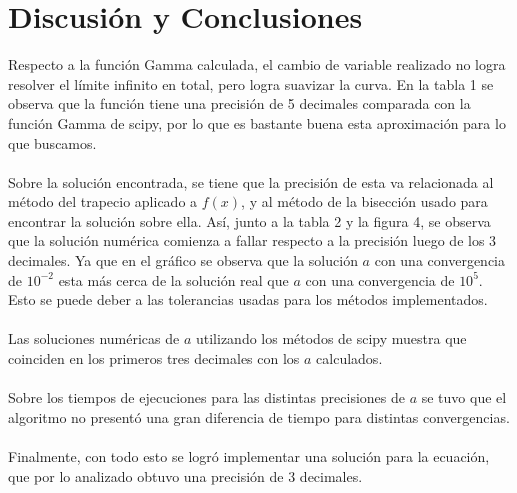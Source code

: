 \documentclass[letterpaper,oneside]{article}
\begin{document}
\section{Discusión y Conclusiones}

Respecto a la función Gamma calculada, el cambio de variable realizado no logra resolver el límite infinito en total, pero logra suavizar la curva. En la tabla 1 se observa que la función tiene una precisión de 5 decimales comparada con la función Gamma de scipy, por lo que es bastante buena esta aproximación para lo que buscamos. \\ \\
Sobre la solución encontrada, se tiene que la precisión de esta va relacionada al método del trapecio aplicado a $f(x)$, y al método de la bisección usado para encontrar la solución sobre ella. Así, junto a la tabla 2 y la figura 4, se observa que la solución numérica comienza a fallar respecto a la precisión luego de los 3 decimales. Ya que en el gráfico se observa que la solución $a$ con una convergencia de $10^{-2}$ esta más cerca de la solución real que $a$ con una convergencia de $10^{5}$. Esto se puede deber a las tolerancias usadas para los métodos implementados.
\\ \\
Las soluciones numéricas de $a$ utilizando los métodos de scipy muestra que coinciden en los primeros tres decimales con los $a$ calculados.
\\ \\
Sobre los tiempos de ejecuciones para las distintas precisiones de $a$ se tuvo que el algoritmo no presentó una gran diferencia de tiempo para distintas convergencias. \\ \\
Finalmente, con todo esto se logró implementar una solución para la ecuación, que por lo analizado obtuvo una precisión de 3 decimales.

\end{document}
